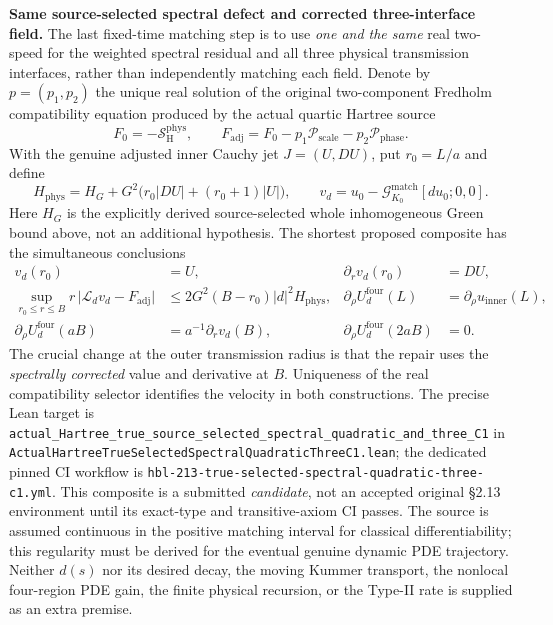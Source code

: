 \documentclass[11pt]{amsart}
\begin{document}
\medskip
\noindent\textbf{Same source-selected spectral defect and corrected
three-interface field.}
The last fixed-time matching step is to use \emph{one and the same}
real two-speed for the weighted spectral residual and all three
physical transmission interfaces, rather than independently matching
each field. Denote by $p=(p_1,p_2)$ the unique real solution of the
original two-component Fredholm compatibility equation produced by
the actual quartic Hartree source
\[
 F_0=-\mathcal S_{\mathrm H}^{\mathrm{phys}},
 \qquad
 F_{\mathrm{adj}}
    =F_0-p_1\mathcal P_{\mathrm{scale}}
          -p_2\mathcal P_{\mathrm{phase}}.
\]
With the genuine adjusted inner Cauchy jet
$J=(U,D U)$, put $r_0=L/a$ and define
\[
 H_{\mathrm{phys}}
  = H_G+G^2\bigl(r_0|D U|+(r_0+1)|U|\bigr),
 \qquad
 v_d=u_0-\mathcal G_{K_0}^{\mathrm{match}}[d u_0;0,0].
\]
Here $H_G$ is the explicitly derived source-selected whole
inhomogeneous Green bound above, not an additional hypothesis.
The shortest proposed composite has the simultaneous conclusions
\[
 \begin{aligned}
 v_d(r_0)&=U,&
 \partial_r v_d(r_0)&=D U,\\
 \sup_{r_0\le r\le B}
  r\,\bigl|\mathcal L_d v_d-F_{\mathrm{adj}}\bigr|
   &\le 2G^2(B-r_0)|d|^2H_{\mathrm{phys}},&
 \partial_\rho U_d^{\mathrm{four}}(L)
   &=\partial_\rho u_{\mathrm{inner}}(L),\\
 \partial_\rho U_d^{\mathrm{four}}(aB)
   &=a^{-1}\partial_r v_d(B),&
 \partial_\rho U_d^{\mathrm{four}}(2aB)&=0.
 \end{aligned}
\]
The crucial change at the outer transmission radius is that the
repair uses the \emph{spectrally corrected} value and derivative at
$B$. Uniqueness of the real compatibility selector identifies the
velocity in both constructions. The precise Lean target is
\texttt{actual\_Hartree\_true\_source\_selected\_spectral\_quadratic\_and\_three\_C1}
in
\texttt{ActualHartreeTrueSelectedSpectralQuadraticThreeC1.lean};
the dedicated pinned CI workflow is
\texttt{hbl-213-true-selected-spectral-quadratic-three-c1.yml}.
This composite is a submitted \emph{candidate}, not an accepted
original \S2.13 environment until its exact-type and transitive-axiom
CI passes. The source is assumed continuous in the positive matching
interval for classical differentiability; this regularity must be
derived for the eventual genuine dynamic PDE trajectory.
Neither $d(s)$ nor its desired decay, the moving Kummer transport,
the nonlocal four-region PDE gain, the finite physical recursion, or
the Type-II rate is supplied as an extra premise.
\end{document}
